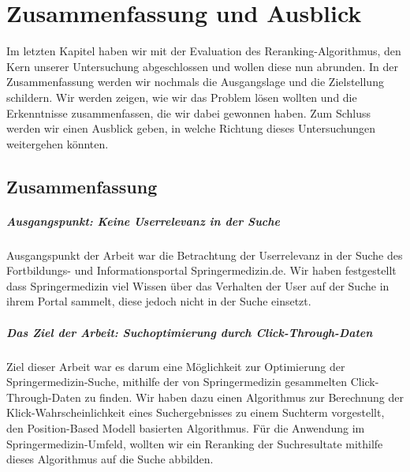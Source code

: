 %
\chapter{Zusammenfassung und Ausblick}
\label{sec:ZusammenfassungAusblick}

Im letzten Kapitel haben wir mit der Evaluation des Reranking-Algorithmus, den Kern unserer Untersuchung abgeschlossen und wollen diese nun abrunden. In der Zusammenfassung werden wir nochmals die Ausgangslage und die Zielstellung schildern. Wir werden zeigen, wie wir das Problem lösen wollten und die Erkenntnisse zusammenfassen, die wir dabei gewonnen haben. Zum Schluss werden wir einen Ausblick geben, in welche Richtung dieses Untersuchungen weitergehen könnten.

\section{Zusammenfassung}
\label{sec:ZusammenfassungAusblick:Zusammenfassung}

\paragraph{Ausgangspunkt: Keine Userrelevanz in der Suche}
Ausgangspunkt der Arbeit war die Betrachtung der Userrelevanz in der Suche des Fortbildungs- und Informationsportal Springermedizin.de. Wir haben festgestellt dass Springermedizin viel Wissen über das Verhalten der User auf der Suche in ihrem Portal sammelt, diese jedoch nicht in der Suche einsetzt. 

\paragraph{Das Ziel der Arbeit: Suchoptimierung durch Click-Through-Daten}
Ziel dieser Arbeit war es darum eine Möglichkeit zur Optimierung der Springermedizin-Suche, mithilfe der von Springermedizin gesammelten Click-Through-Daten zu finden. Wir haben dazu einen Algorithmus zur Berechnung der Klick-Wahrscheinlichkeit eines Suchergebnisses zu einem Suchterm vorgestellt, den Position-Based Modell basierten Algorithmus. Für die Anwendung im Springermedizin-Umfeld, wollten wir ein Reranking der Suchresultate mithilfe dieses Algorithmus auf die Suche abbilden.

